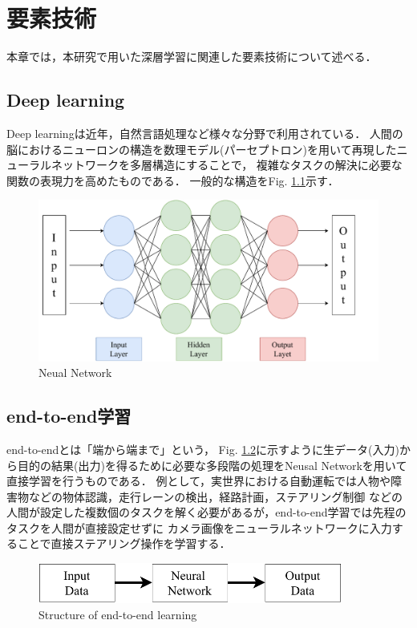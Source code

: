\chapter{要素技術}
本章では，本研究で用いた深層学習に関連した要素技術について述べる．

\section{Deep learning}
Deep learningは近年，自然言語処理など様々な分野で利用されている．
人間の脳におけるニューロンの構造を数理モデル(パーセプトロン)を用いて再現したニューラルネットワークを多層構造にすることで，
複雑なタスクの解決に必要な関数の表現力を高めたものである．
一般的な構造をFig. \ref{fig::network}示す．

\begin{figure}[h]
    \centering
    \includegraphics[width = 12cm]{./figs/net.pdf}
    \caption{Neual Network}
    \label{fig::network}
\end{figure}

\section{end-to-end学習}
end-to-endとは「端から端まで」という，
Fig. \ref{fig::e2e}に示すように生データ(入力)から目的の結果(出力)を得るために必要な多段階の処理をNeusal Networkを用いて直接学習を行うものである．
例として，実世界における自動運転では人物や障害物などの物体認識，走行レーンの検出，経路計画，ステアリング制御
などの人間が設定した複数個のタスクを解く必要があるが，end-to-end学習では先程のタスクを人間が直接設定せずに
カメラ画像をニューラルネットワークに入力することで直接ステアリング操作を学習する．

\vspace{2.0zh}
\begin{figure}[h]
    \centering
    \includegraphics[width = 10cm]{./figs/e2e.pdf}
    \caption{Structure of end-to-end learning}
    \label{fig::e2e}
\end{figure}

